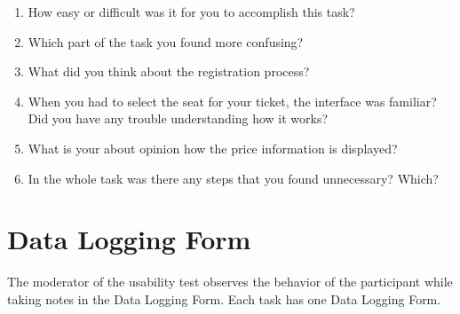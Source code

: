 \documentclass[a4paper]{article}
\begin{document}
\begin{enumerate}[label=4.\theenumi{}.]
  \item How easy or difficult was it for you to accomplish this task?
  \item Which part of the task you found more confusing?
  \item What did you think about the registration process?
  \item When you had to select the seat for your ticket, the interface was familiar? Did you have any trouble understanding how it works?
  \item What is your about opinion how the price information is displayed?
  \item In the whole task was there any steps that you found unnecessary? Which?
\end{enumerate}

\section{Data Logging Form}

The moderator of the usability test observes the behavior of the participant while taking notes in the Data Logging Form. Each task has one Data Logging Form.







\end{document}
